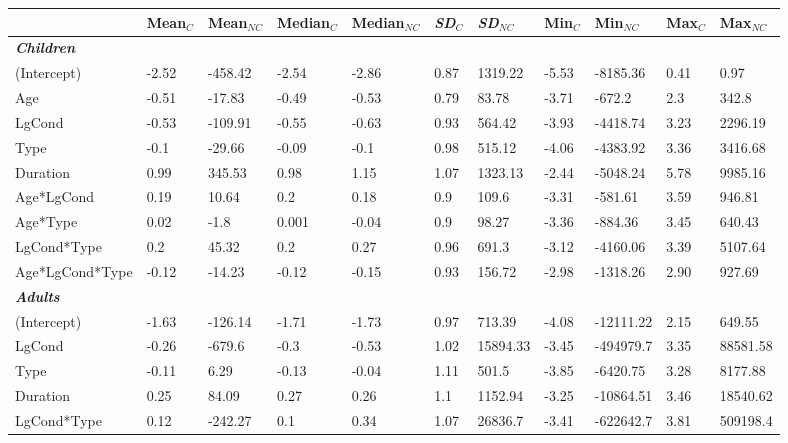 \documentclass[authoryear, 12pt]{elsarticle}
\begin{document}
\linespread{1}
\begin{table}
  \begin{scriptsize}
\centering
  \begin{tabular}{lllllllllll}
    & Mean$_{C}$ & Mean$_{NC}$ & Median$_{C}$ & Median$_{NC}$ & \textit{SD}$_{C}$ & \textit{SD}$_{NC}$ & Min$_{C}$ & Min$_{NC}$ & Max$_{C}$ & Max$_{NC}$ \\
    \hline
	\textbf{\textit{Children}} &&&&& \\
    \hline
    (Intercept)					& -2.52	& -458.42	& -2.54	& -2.86	& 0.87	& 1319.22	& -5.53	& -8185.36		& 0.41	& 0.97 \\
    Age								& -0.51	& -17.83	& -0.49	& -0.53	& 0.79	& 83.78		& -3.71	& -672.2		& 2.3		& 342.8 \\
    LgCond							& -0.53	& -109.91	& -0.55	& -0.63	& 0.93	& 564.42	& -3.93	& -4418.74		& 3.23	& 2296.19 \\
    Type							& -0.1	& -29.66	& -0.09	& -0.1	& 0.98	& 515.12	& -4.06	& -4383.92		& 3.36	& 3416.68 \\
    Duration						& 0.99	& 345.53	& 0.98	& 1.15	& 1.07	& 1323.13	& -2.44	& -5048.24		& 5.78	& 9985.16 \\
    Age*LgCond					& 0.19	& 10.64		& 0.2		& 0.18	& 0.9		& 109.6		& -3.31	& -581.61		& 3.59	& 946.81 \\
    Age*Type						& 0.02	& -1.8		& 0.001	& -0.04	& 0.9		& 98.27		& -3.36	& -884.36		& 3.45	& 640.43 \\
    LgCond*Type					& 0.2		& 45.32		& 0.2		& 0.27	& 0.96	& 691.3		& -3.12	& -4160.06		& 3.39	& 5107.64 \\
    Age*LgCond*Type			& -0.12	& -14.23	& -0.12	& -0.15	& 0.93	& 156.72	& -2.98	& -1318.26		& 2.90	& 927.69 \\
    \hline
	\textbf{\textit{Adults}} &&&&& \\
    \hline
    (Intercept)    			& -1.63	& -126.14	& -1.71	& -1.73	& 0.97	& 713.39	& -4.08	& -12111.22	& 2.15	& 649.55		\\
    LgCond  						& -0.26	& -679.6	& -0.3	& -0.53	& 1.02	& 15894.33	& -3.45	& -494979.7	& 3.35	& 88581.58	\\
    Type 							& -0.11	& 6.29		& -0.13	& -0.04	& 1.11	& 501.5		& -3.85	& -6420.75		& 3.28	& 8177.88		\\
    Duration  					& 0.25	& 84.09		& 0.27	& 0.26	& 1.1		& 1152.94	& -3.25	& -10864.51	& 3.46	& 18540.62	\\
    LgCond*Type  				& 0.12	& -242.27	& 0.1		& 0.34	& 1.07	& 26836.7	& -3.41	& -622642.7	& 3.81	& 509198.4	\\

\end{tabular}
\end{scriptsize}
\end{table}
\end{document}
